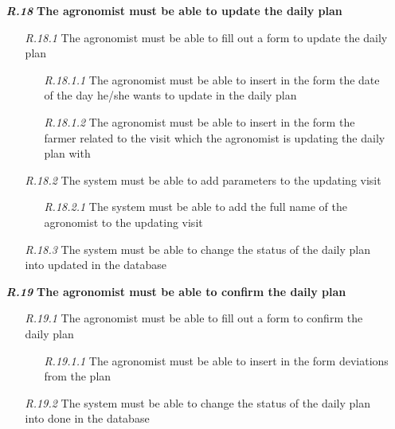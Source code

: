 \begin{itemize}
        \item [\textbf{\textit{R.18}}] \textbf{The agronomist must be able to update the daily plan}
        \begin{itemize}
            \item [\textit{R.18.1}] The agronomist must be able to fill out a form to update the daily plan
            \begin{itemize}
                \item [\textit{R.18.1.1}] The agronomist must be able to insert in the form the date of the day he/she wants to update in the daily plan
		        \item [\textit{R.18.1.2}] The agronomist must be able to insert in the form the farmer related to the visit which the agronomist is updating the daily plan with
            \end{itemize}
            \item [\textit{R.18.2}] The system must be able to add parameters to the updating visit
            \begin{itemize}
                \item [\textit{R.18.2.1}] The system must be able to add the full name of the agronomist to the updating visit
            \end{itemize}
            \item [\textit{R.18.3}] The system must be able to change the status of the daily plan into updated in the database
        \end{itemize}
		
        \item [\textbf{\textit{R.19}}] \textbf{The agronomist must be able to confirm the daily plan}
        \begin{itemize}
            \item [\textit{R.19.1}] The agronomist must be able to fill out a form to confirm the daily plan
            \begin{itemize}
                \item [\textit{R.19.1.1}] The agronomist must be able to insert in the form deviations from the plan
            \end{itemize}
            \item [\textit{R.19.2}] The system must be able to change the status of the daily plan into done in the database
        \end{itemize}


\end{itemize}
